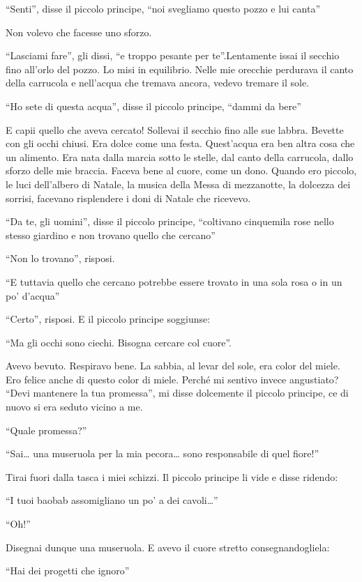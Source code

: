 \documentclass[11pt]{scrbook}
\begin{document}
``Senti'', disse il piccolo principe, ``noi svegliamo questo pozzo e lui
canta''

Non volevo che facesse uno sforzo.

``Lasciami fare'', gli dissi, ``e troppo pesante per te''.Lentamente
issai il secchio fino all'orlo del pozzo. Lo misi in equilibrio. Nelle
mie orecchie perdurava il canto della carrucola e nell'acqua che tremava
ancora, vedevo tremare il sole.

``Ho sete di questa acqua'', disse il piccolo principe, ``dammi da
bere''

E capii quello che aveva cercato! Sollevai il secchio fino alle sue
labbra. Bevette con gli occhi chiusi. Era dolce come una festa.
Quest'acqua era ben altra cosa che un alimento. Era nata dalla marcia
sotto le stelle, dal canto della carrucola, dallo sforzo delle mie
braccia. Faceva bene al cuore, come un dono. Quando ero piccolo, le luci
dell'albero di Natale, la musica della Messa di mezzanotte, la dolcezza
dei sorrisi, facevano risplendere i doni di Natale che ricevevo.

``Da te, gli uomini'', disse il piccolo principe, ``coltivano cinquemila
rose nello stesso giardino e non trovano quello che cercano''

``Non lo trovano'', risposi.

``E tuttavia quello che cercano potrebbe essere trovato in una sola rosa
o in un po' d'acqua''

``Certo'', risposi. E il piccolo principe soggiunse:

``Ma gli occhi sono ciechi. Bisogna cercare col cuore''.

Avevo bevuto. Respiravo bene. La sabbia, al levar del sole, era color
del miele. Ero felice anche di questo color di miele. Perché mi sentivo
invece angustiato? ``Devi mantenere la tua promessa'', mi disse
dolcemente il piccolo principe, ce di nuovo si era seduto vicino a me.

``Quale promessa?''

``Sai\ldots{} una museruola per la mia pecora\ldots{} sono responsabile
di quel fiore!''

Tirai fuori dalla tasca i miei schizzi. Il piccolo principe li vide e
disse ridendo:

``I tuoi baobab assomigliano un po' a dei cavoli\ldots{}''

``Oh!''

Disegnai dunque una museruola. E avevo il cuore stretto
consegnandogliela:

``Hai dei progetti che ignoro''
\end{document}
